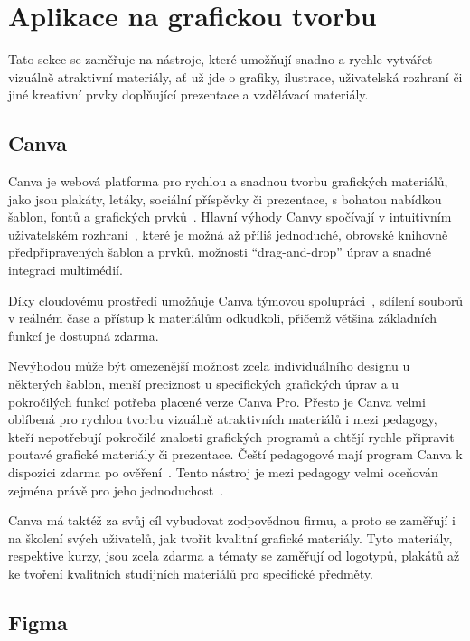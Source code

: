 \section{Aplikace na grafickou tvorbu}\label{text:analyza/grafika}

Tato sekce se zaměřuje na nástroje, které umožňují snadno a rychle vytvářet vizuálně atraktivní materiály, ať už jde o grafiky, ilustrace, uživatelská rozhraní či jiné kreativní prvky doplňující prezentace a vzdělávací materiály.

\subsection{Canva}\label{text:canva}

Canva je webová platforma pro rychlou a snadnou tvorbu grafických materiálů, jako jsou plakáty, letáky, sociální příspěvky či prezentace, s bohatou nabídkou šablon, fontů a grafických prvků~\cite{canva_website}. 
Hlavní výhody Canvy spočívají v intuitivním uživatelském rozhraní~\cite{canva_recenze}, které je možná až příliš jednoduché, obrovské knihovně předpřipravených šablon a prvků, možnosti \enquote{drag-and-drop} úprav a snadné integraci multimédií.

Díky cloudovému prostředí umožňuje Canva týmovou spolupráci~\cite{canva_live_help, canva_live_features}, sdílení souborů v reálném čase a přístup k materiálům odkudkoli, přičemž většina základních funkcí je dostupná zdarma. 

Nevýhodou může být omezenější možnost zcela individuálního designu u některých šablon, menší preciznost u specifických grafických úprav a u pokročilých funkcí potřeba placené verze Canva Pro. 
Přesto je Canva velmi oblíbená pro rychlou tvorbu vizuálně atraktivních materiálů i mezi pedagogy, kteří nepotřebují pokročilé znalosti grafických programů a chtějí rychle připravit poutavé grafické materiály či prezentace.
Čeští pedagogové mají program Canva k dispozici zdarma po ověření~\cite{canva_education}. Tento nástroj je mezi pedagogy velmi oceňován zejména právě pro jeho jednoduchost~\cite{canva_facebook}.

Canva má taktéž za svůj cíl vybudovat zodpovědnou firmu, a proto se zaměřují i na školení svých uživatelů, jak tvořit kvalitní grafické materiály.
Tyto materiály, respektive kurzy, jsou zcela zdarma a tématy se zaměřují od logotypů, plakátů až ke tvoření kvalitních studijních materiálů pro specifické předměty.


\subsection{Figma}\label{text:figma_popis}

